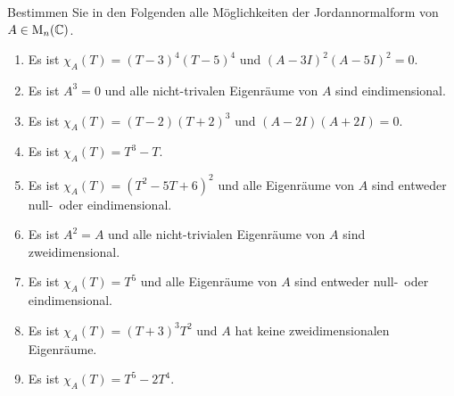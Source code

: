 \begin{question}
  Bestimmen Sie in den Folgenden alle Möglichkeiten der Jordannormalform von $A \in \operatorname{M}_n(\mathbb{C})$.
  \begin{enumerate}[leftmargin=*]
    \item
     Es ist $\chi_A(T) = (T-3)^4 (T-5)^4$ und $(A - 3I)^2 (A - 5I)^2 = 0$.
    \item
      Es ist $A^3 = 0$ und alle nicht-trivalen Eigenräume von $A$ sind eindimensional.
    \item
      Es ist $\chi_A(T) = (T-2)(T+2)^3$ und $(A - 2I)(A + 2I) = 0$.
    \item
      Es ist $\chi_A(T) = T^3 - T$.
    \item
      Es ist $\chi_A(T) = (T^2 -5T + 6)^2$ und alle Eigenräume von $A$ sind entweder null-\ oder eindimensional.
    \item
      Es ist $A^2 = A$ und alle nicht-trivialen Eigenräume von $A$ sind zweidimensional.
    \item
      Es ist $\chi_A(T) = T^5$ und alle Eigenräume von $A$ sind entweder null-\ oder eindimensional.
    \item
      Es ist $\chi_A(T) = (T+3)^3 T^2$ und $A$ hat keine zweidimensionalen Eigenräume.
    \item
      Es ist $\chi_A(T) = T^5 - 2 T^4$.
  \end{enumerate}
\end{question}


